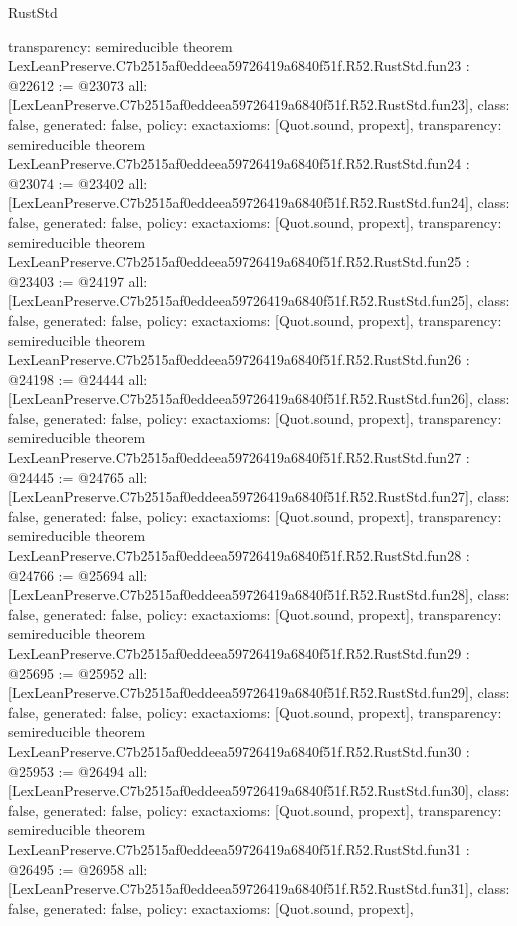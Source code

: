 \begin{lexlean}{RustStd}
\begin{coremodule}
{  transparency: semireducible
}
theorem LexLeanPreserve.C7b2515af0eddeea59726419a6840f51f.R52.RustStd.fun23 : @22612 := @23073 {
  all: [LexLeanPreserve.C7b2515af0eddeea59726419a6840f51f.R52.RustStd.fun23],
  class: false,
  generated: false,
  policy: exact{axioms: [Quot.sound, propext]},
  transparency: semireducible
}
theorem LexLeanPreserve.C7b2515af0eddeea59726419a6840f51f.R52.RustStd.fun24 : @23074 := @23402 {
  all: [LexLeanPreserve.C7b2515af0eddeea59726419a6840f51f.R52.RustStd.fun24],
  class: false,
  generated: false,
  policy: exact{axioms: [Quot.sound, propext]},
  transparency: semireducible
}
theorem LexLeanPreserve.C7b2515af0eddeea59726419a6840f51f.R52.RustStd.fun25 : @23403 := @24197 {
  all: [LexLeanPreserve.C7b2515af0eddeea59726419a6840f51f.R52.RustStd.fun25],
  class: false,
  generated: false,
  policy: exact{axioms: [Quot.sound, propext]},
  transparency: semireducible
}
theorem LexLeanPreserve.C7b2515af0eddeea59726419a6840f51f.R52.RustStd.fun26 : @24198 := @24444 {
  all: [LexLeanPreserve.C7b2515af0eddeea59726419a6840f51f.R52.RustStd.fun26],
  class: false,
  generated: false,
  policy: exact{axioms: [Quot.sound, propext]},
  transparency: semireducible
}
theorem LexLeanPreserve.C7b2515af0eddeea59726419a6840f51f.R52.RustStd.fun27 : @24445 := @24765 {
  all: [LexLeanPreserve.C7b2515af0eddeea59726419a6840f51f.R52.RustStd.fun27],
  class: false,
  generated: false,
  policy: exact{axioms: [Quot.sound, propext]},
  transparency: semireducible
}
theorem LexLeanPreserve.C7b2515af0eddeea59726419a6840f51f.R52.RustStd.fun28 : @24766 := @25694 {
  all: [LexLeanPreserve.C7b2515af0eddeea59726419a6840f51f.R52.RustStd.fun28],
  class: false,
  generated: false,
  policy: exact{axioms: [Quot.sound, propext]},
  transparency: semireducible
}
theorem LexLeanPreserve.C7b2515af0eddeea59726419a6840f51f.R52.RustStd.fun29 : @25695 := @25952 {
  all: [LexLeanPreserve.C7b2515af0eddeea59726419a6840f51f.R52.RustStd.fun29],
  class: false,
  generated: false,
  policy: exact{axioms: [Quot.sound, propext]},
  transparency: semireducible
}
theorem LexLeanPreserve.C7b2515af0eddeea59726419a6840f51f.R52.RustStd.fun30 : @25953 := @26494 {
  all: [LexLeanPreserve.C7b2515af0eddeea59726419a6840f51f.R52.RustStd.fun30],
  class: false,
  generated: false,
  policy: exact{axioms: [Quot.sound, propext]},
  transparency: semireducible
}
theorem LexLeanPreserve.C7b2515af0eddeea59726419a6840f51f.R52.RustStd.fun31 : @26495 := @26958 {
  all: [LexLeanPreserve.C7b2515af0eddeea59726419a6840f51f.R52.RustStd.fun31],
  class: false,
  generated: false,
  policy: exact{axioms: [Quot.sound, propext]},
}
\end{coremodule}
\end{lexlean}
